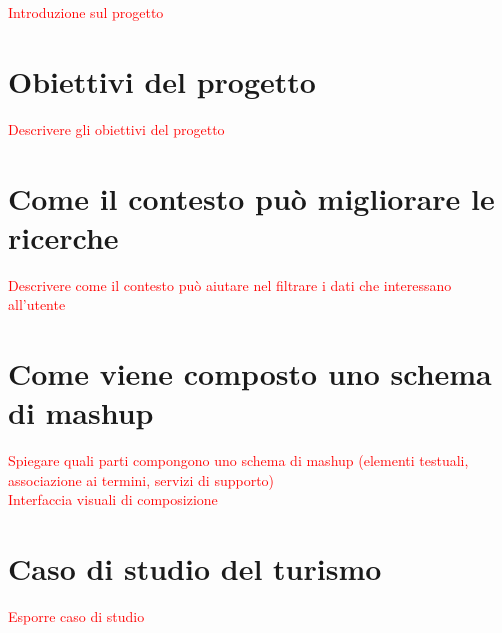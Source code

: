 \textcolor{red}{Introduzione sul progetto}

\section{Obiettivi del progetto\label{sec:obiettivi-progetto}}

\textcolor{red}{Descrivere gli obiettivi del progetto}

\section{Come il contesto pu\`o migliorare le ricerche\label{sec:contesto-ricerche}}

\textcolor{red}{Descrivere come il contesto pu\`o aiutare nel filtrare i dati che interessano all'utente}

\section{Come viene composto uno schema di mashup\label{sec:schema-mashup}}

\textcolor{red}{Spiegare quali parti compongono uno schema di mashup (elementi testuali, associazione ai termini, servizi di supporto)\\
Interfaccia visuali di composizione}

\section{Caso di studio del turismo\label{sec:caso-studio-turismo}}

\textcolor{red}{Esporre caso di studio}